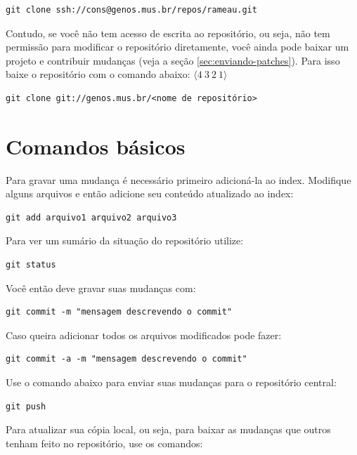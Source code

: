 \documentclass[12pt,brazil]{book}
\begin{document}
\begin{verbatim}
git clone ssh://cons@genos.mus.br/repos/rameau.git
\end{verbatim}

Contudo, se você não tem acesso de escrita ao repositório, ou seja,
não tem permissão para modificar o repositório diretamente, você ainda
pode baixar um projeto e contribuir mudanças (veja a seção
\ref{sec:enviando-patches}). Para isso baixe o repositório com o
comando abaixo:
$\langle 4 \: 3\:  2\: 1 \rangle$
\begin{verbatim}
git clone git://genos.mus.br/<nome de repositório>
\end{verbatim}

\section{Comandos básicos}
\label{sec:comandos-basicos}

Para gravar uma mudança é necessário primeiro adicioná-la ao
index. Modifique alguns arquivos e então adicione seu conteúdo
atualizado ao index:

\begin{verbatim}
git add arquivo1 arquivo2 arquivo3
\end{verbatim}

Para ver um sumário da situação do repositório utilize:

\begin{verbatim}
git status
\end{verbatim}

Você então deve gravar suas mudanças com:

\begin{verbatim}
git commit -m "mensagem descrevendo o commit"
\end{verbatim}

Caso queira adicionar todos os arquivos modificados pode fazer:

\begin{verbatim}
git commit -a -m "mensagem descrevendo o commit"
\end{verbatim}

Use o comando abaixo para enviar suas mudanças para o repositório
central:

\begin{verbatim}
git push
\end{verbatim}

Para atualizar sua cópia local, ou seja, para baixar as mudanças que
outros tenham feito no repositório, use os comandos:
\end{document}

